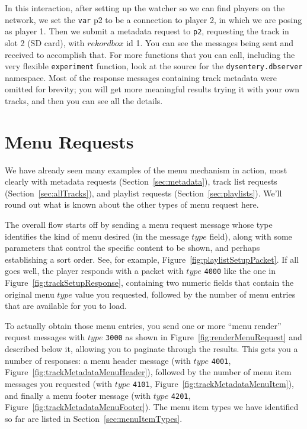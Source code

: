 \documentclass[11pt]{article}
\begin{document}
In this interaction, after setting up the watcher so we can find
players on the network, we set the {\tt var} p2 to be a connection to
player 2, in which we are posing as player 1. Then we submit a
metadata request to {\tt p2}, requesting the track in slot 2 (SD
card), with $rekordbox$ id 1. You can see the messages being sent and
received to accomplish that. For more functions that you can call,
including the very flexible {\tt experiment} function, look at the
source for the {\tt dysentery.dbserver} namespace. Most of the
response messages containing track metadata were omitted for brevity;
you will get more meaningful results trying it with your own tracks,
and then you can see all the details.

\section{Menu Requests}
\label{sec:menuRequests}

We have already seen many examples of the menu mechanism in action,
most clearly with metadata requests (Section~\ref{sec:metadata}), track
list requests (Section~\ref{sec:allTracks}), and playlist requests
(Section~\ref{sec:playlists}). We'll round out what is known about the
other types of menu request here.

The overall flow starts off by sending a menu request message whose
type identifies the kind of menu desired (in the message $type$
field), along with some parameters that control the specific content
to be shown, and perhaps establishing a sort order. See, for example,
Figure~\ref{fig:playlistSetupPacket}. If all goes well, the player
responds with a packet with $type$ {\tt 4000} like the one in
Figure~\ref{fig:trackSetupResponse}, containing two numeric fields
that contain the original menu $type$ value you requested, followed by
the number of menu entries that are available for you to load.

To actually obtain those menu entries, you send one or more ``menu
render'' request messages with $type$ {\tt 3000} as shown in
Figure~\ref{fig:renderMenuRequest} and described below it, allowing
you to paginate through the results. This gets you a number of
responses: a menu header message (with $type$ {\tt 4001},
Figure~\ref{fig:trackMetadataMenuHeader}), followed by the number of
menu item messages you requested (with $type$ {\tt 4101},
Figure~\ref{fig:trackMetadataMenuItem}), and finally a menu footer
message (with $type$ {\tt 4201},
Figure~\ref{fig:trackMetadataMenuFooter}). The menu item types we have
identified so far are listed in Section~\ref{sec:menuItemTypes}.
\end{document}
